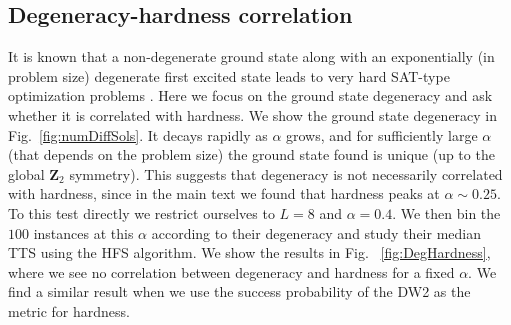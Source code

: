 \subsection{Degeneracy-hardness correlation}
It is known that a non-degenerate ground state along with an exponentially (in problem size) degenerate first excited state leads to very hard SAT-type optimization problems \cite{Neuhaus:2014kx}. Here we focus on the ground state degeneracy and ask whether it is correlated with hardness. We show the ground state degeneracy in Fig.~\ref{fig:numDiffSols}. It decays rapidly as $\alpha$ grows, and for sufficiently large $\alpha$ (that depends on the problem size) the ground state found is unique (up to the global $\mathbf{Z}_2$ symmetry). This suggests that degeneracy is not necessarily correlated with hardness, since in the main text we found that hardness peaks at $\alpha \sim 0.25$. To this test directly  we restrict ourselves to $L=8$ and $\alpha = 0.4$.  We then bin the $100$ instances at this $\alpha$ according to their degeneracy and study their median TTS using the HFS algorithm.  We show the results in Fig.~ \ref{fig:DegHardness}, where we see no correlation between degeneracy and hardness for a fixed $\alpha$.  We find a similar result when we use the success probability of the DW2 as the metric for hardness.

